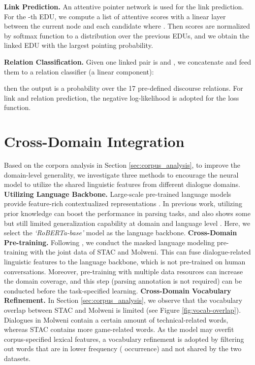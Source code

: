 \documentclass[11pt]{article}
\begin{document}
\noindent\textbf{Link Prediction.} An attentive pointer network \cite{vinyals2015pointer} is used for the link prediction. For the -th EDU, we compute a list of attentive scores with a linear layer between the current node and each candidate  where . Then scores are normalized by softmax function to a distribution over the previous EDUs, and we obtain the linked EDU with the largest pointing probability.

\vspace{-0.4cm}


\noindent\textbf{Relation Classification.} Given one linked pair is  and , we concatenate and feed them to a relation classifier (a linear component):

then the output is a probability over the 17 pre-defined discourse relations. For link and relation prediction, the negative log-likelihood is adopted for the loss function.

\section{Cross-Domain Integration}
Based on the corpora analysis in Section \ref{sec:corpus_analysis}, to improve the domain-level generality, we investigate three methods to encourage the neural model to utilize the shared linguistic features from different dialogue domains.
\newline\noindent \textbf{Utilizing Language Backbone.}
Large-scale pre-trained language models provide feature-rich contextualized representations \cite{devlin-2019-BERT}. In previous work, utilizing prior knowledge can boost the performance in parsing tasks, and also shows some but still limited generalization capability at domain and language level \cite{liu2020multiRST}.
Here, we select the \textit{`RoBERTa-base'} model \citep{liu2019roberta} as the language backbone.
\newline\noindent \textbf{Cross-Domain Pre-training.}
Following \citet{dontstoppretraining2020}, we conduct the masked language modeling pre-training with the joint data of STAC and Molweni. This can fuse dialogue-related linguistic features to the language backbone, which is not pre-trained on human conversations. Moreover, pre-training with multiple data resources can increase the domain coverage, and this step (parsing annotation is not required) can be conducted before the task-specified learning.
\newline\noindent \textbf{Cross-Domain Vocabulary Refinement.}
In Section \ref{sec:corpus_analysis}, we observe that the vocabulary overlap between STAC and Molweni is limited (see Figure \ref{fig:vocab-overlap}). Dialogues in Molweni contain a certain amount of technical-related words, whereas STAC contains more game-related words. As the model may overfit corpus-specified lexical features, a vocabulary refinement is adopted by filtering out words that are in lower frequency ( occurrence) and not shared by the two datasets.
\end{document}
